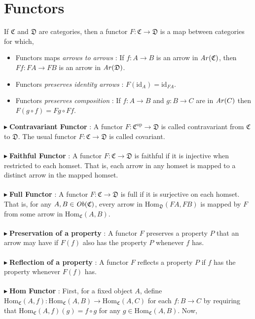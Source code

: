 \documentclass{article}
\theoremstyle{definition}
\theoremstyle{remark}
\theoremstyle{definition}
\theoremstyle{definition}
\theoremstyle{definition}
\newcommand{\cat}[1]{\mathfrak{#1}}
\newcommand{\opcat}[1]{\mathfrak{#1}^{\text{op}}}
\newcommand{\obj}[1]{\text{\textit{Ob}}(#1)}
\newcommand{\arr}[1]{\text{\textit{Ar}}(#1)}
\newcommand{\Id}[1]{\text{id}_{#1}}
\newcommand{\homset}[3]{\text{Hom}_{#1}(#2,#3)}
\newcommand{\point}[0]{$\blacktriangleright\;$}
\begin{document}
\section{Functors}
If $ \cat{C} $ and $ \cat{D} $ are categories, then a functor $ F : \cat{C} \to \cat{D} $ is a map between categories for which,
\begin{itemize}
	\item{Functors maps \textit{arrows to arrows} : If $ f:A\to B $ is an arrow in $ \arr{\cat{C}} $, then $ Ff : FA \to FB $ is an arrow in $ \arr{\cat{D}} $.}
	\item {Functors \textit{preserves identity arrows} : $ F(\Id{A}) =  \Id{FA}$.}
	\item {Functors \textit{preserves composition} : If $f: A\to B $ and $ g: B\to C $ are in $ \arr{C} $ then $ F(g\circ f) = Fg \circ Ff $.}
\end{itemize}
\point \textbf{Contravariant Functor} : A functor $ F:\opcat{C}\to \cat{D} $ is called contravariant from $ \cat{C} $ to $ \cat{D} $. The usual functor $ F:\cat{C} \to \cat{D}$ is called covariant.\\\\
\point\textbf{Faithful Functor} : A functor $ F:\cat{C}\to \cat{D} $ is faithful if it is injective when restricted to each homset. That is, each arrow in any homset is mapped to a distinct arrow in the mapped homset.\\\\
\point \textbf{Full Functor} : A functor $ F:\cat{C}\to \cat{D} $ is full if it is surjective on each homset. That is, for any $ A,B\in \obj{\cat{C}} $, every arrow in $ \homset{\cat{D}}{FA}{FB} $ is mapped by $ F $ from some arrow in $ \homset{\cat{C}}{A}{B} $.\\\\
\point \textbf{Preservation of a property} : A functor $ F $ preserves a property $ P $ that an arrow may have if $ F(f) $ also has the property $ P $ whenever $ f $ has.\\\\
\point \textbf{Reflection of a property} : A functor $ F $ reflects a property $ P $ if $ f $ has the property whenever $ F(f) $ has.\\\\
\point \textbf{Hom Functor} : First, for a fixed object $ A $, define $ \homset{\cat{C}}{A}{f}  : \homset{\cat{C}}{A}{B} \longrightarrow \homset{\cat{C}}{A}{C}$ for each $ f:B\longrightarrow C $ by requiring that $ \homset{\cat{C}}{A}{f}(g) = f\circ g$ for any $ g\in \homset{\cat{C}}{A}{B}$. Now, 
\end{document}
